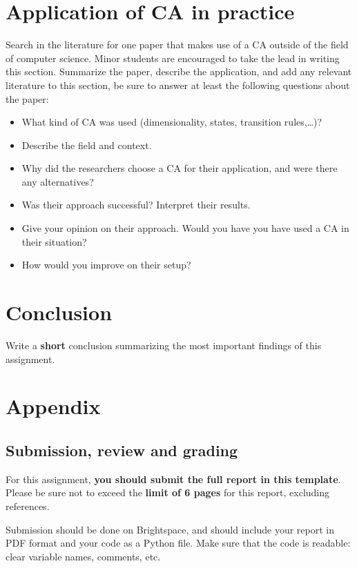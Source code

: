 \documentclass[runningheads]{llncs}
\begin{document}
\section{Application of CA in practice}
Search in the literature for one paper that makes use of a CA outside of the field of computer science. Minor students are encouraged to take the lead in writing this section. Summarize the paper, describe the application, and add any relevant literature to this section, be sure to answer at least the following questions about the paper: 
\begin{itemize}
    \item What kind of CA was used (dimensionality, states, transition rules,\dots)? 
    \item Describe the field and context.
    \item Why did the researchers choose a CA for their application, and were there any alternatives?
    \item Was their approach successful? Interpret their results.
    \item Give your opinion on their approach. Would you have you have used a CA in their situation?
    \item How would you improve on their setup? 
\end{itemize}


\section{Conclusion}
Write a \textbf{short} conclusion summarizing the most important findings of this assignment. 

\appendix
\section{Appendix}
\subsection{Submission, review and grading}\label{sec:submission}

For this assignment, \textbf{you should submit the full report in this template}. Please be sure not to exceed the \textbf{limit of 6 pages} for this report, excluding references.

Submission should be done on Brightspace, and should include your report in PDF format and your code as a Python file.  Make sure that the code is readable: clear variable names, comments, etc. 



\end{document}
